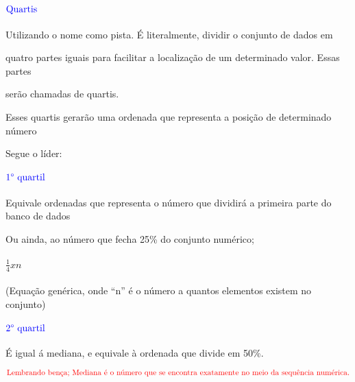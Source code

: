 \documentclass[]{book}
\begin{document}
\hypertarget{colorbluetextquartis}{%
\chapter{\texorpdfstring{\(\color{blue}{\text{Quartis}}\)}{\textbackslash{}color\{blue\}\{\textbackslash{}text\{Quartis\}\}}}\label{colorbluetextquartis}}

Utilizando o nome como pista. É literalmente, dividir o conjunto de dados em

quatro partes iguais para facilitar a localização de um determinado valor. Essas partes

serão chamadas de quartis.

Esses quartis gerarão uma ordenada que representa a posição de determinado número

Segue o líder:

\hypertarget{colorbluetext1-quartil}{%
\subsubsection{\texorpdfstring{\(\color{blue}{\text{1° quartil}}\)}{\textbackslash{}color\{blue\}\{\textbackslash{}text\{1° quartil\}\}}}\label{colorbluetext1-quartil}}

Equivale ordenadas que representa o número que dividirá a primeira parte do banco de dados

Ou ainda, ao número que fecha 25\% do conjunto numérico;

\hypertarget{frac14-x-n}{%
\subsubsection{\texorpdfstring{\(\frac{1}{4} x n\)}{\textbackslash{}frac\{1\}\{4\} x n}}\label{frac14-x-n}}

(Equação genérica, onde ``n'' é o número a quantos elementos existem no conjunto)

\hypertarget{colorbluetext2-quartil}{%
\subsubsection{\texorpdfstring{\(\color{blue}{\text{2° quartil}}\)}{\textbackslash{}color\{blue\}\{\textbackslash{}text\{2° quartil\}\}}}\label{colorbluetext2-quartil}}

É igual á mediana, e equivale à ordenada que divide em 50\%.

\(\color{red}{\text{Lembrando bença; Mediana é o número que se encontra exatamente no meio da sequência numérica.}}\)
\end{document}

